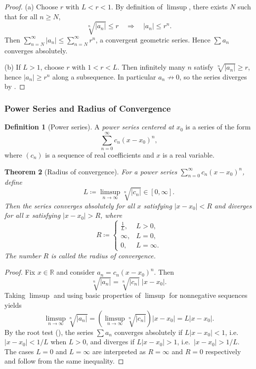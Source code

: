 \documentclass[12pt]{article}
\numberwithin{equation}{section}
\def\abs#1{|#1|}
\newcommand{\RR}{\mathbb{R}}
\DeclarePairedDelimiter{\abs}{\lvert}{\rvert}
\newcommand{\casesm}[1]{\begin{cases}#1\end{cases}}
\theoremstyle{plain}
\newtheorem{theorem}{Theorem}[section]
\theoremstyle{definition}
\newtheorem{definition}[theorem]{Definition}
\theoremstyle{remark}
\begin{document}
\begin{proof}
(a) Choose $r$ with $L<r<1$.
By definition of $\limsup$, there exists $N$ such that for all $n\ge N$,
\[
\sqrt[n]{\abs{a_n}}\le r \quad\Rightarrow\quad \abs{a_n}\le r^n.
\]
Then $\sum_{n=N}^{\infty}\abs{a_n}\le \sum_{n=N}^{\infty} r^n$, a convergent geometric series. Hence $\sum a_n$ converges absolutely.

(b) If $L>1$, choose $r$ with $1<r<L$. Then infinitely many $n$ satisfy $\sqrt[n]{\abs{a_n}}\ge r$, hence $\abs{a_n}\ge r^n$ along a subsequence.
In particular $a_n\not\to 0$, so the series diverges by .
\end{proof}

\subsubsection{Power Series and Radius of Convergence}

\begin{definition}[Power series]
A \emph{power series centered at $x_0$} is a series of the form
\[
\sum_{n=0}^{\infty} c_n (x-x_0)^n,
\]
where $(c_n)$ is a sequence of real coefficients and $x$ is a real variable.
\end{definition}

\begin{theorem}[Radius of convergence]\label{thm:radius}
For a power series $\sum_{n=0}^{\infty} c_n (x-x_0)^n$, define
\[
L \coloneqq \limsup_{n\to\infty}\sqrt[n]{\abs{c_n}} \in [0,\infty].
\]
Then the series converges absolutely for all $x$ satisfying $\abs{x-x_0}<R$ and diverges for all $x$ satisfying $\abs{x-x_0}>R$, where
\[
R \coloneqq
\casesm{
\frac{1}{L}, & L>0,\\
\infty, & L=0,\\
0, & L=\infty.
}
\]
The number $R$ is called the \emph{radius of convergence}.
\end{theorem}

\begin{proof}
Fix $x\in\RR$ and consider $a_n=c_n(x-x_0)^n$.
Then
\[
\sqrt[n]{\abs{a_n}} = \sqrt[n]{\abs{c_n}}\;\abs{x-x_0}.
\]
Taking $\limsup$ and using basic properties of $\limsup$ for nonnegative sequences yields
\[
\limsup_{n\to\infty}\sqrt[n]{\abs{a_n}} = \left(\limsup_{n\to\infty}\sqrt[n]{\abs{c_n}}\right)\abs{x-x_0}=L\abs{x-x_0}.
\]
By the root test (), the series $\sum a_n$ converges absolutely if $L\abs{x-x_0}<1$, i.e.\ $\abs{x-x_0}<1/L$ when $L>0$,
and diverges if $L\abs{x-x_0}>1$, i.e.\ $\abs{x-x_0}>1/L$.
The cases $L=0$ and $L=\infty$ are interpreted as $R=\infty$ and $R=0$ respectively and follow from the same inequality.
\end{proof}
\end{document}

